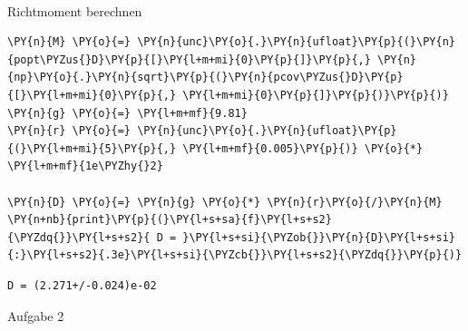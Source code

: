     \begin{center}
    \end{center}
    { \hspace*{\fill} \\}
    
    Richtmoment berechnen

    \begin{tcolorbox}[breakable, size=fbox, boxrule=1pt, pad at break*=1mm,colback=cellbackground, colframe=cellborder]
\begin{Verbatim}[commandchars=\\\{\}]
\PY{n}{M} \PY{o}{=} \PY{n}{unc}\PY{o}{.}\PY{n}{ufloat}\PY{p}{(}\PY{n}{popt\PYZus{}D}\PY{p}{[}\PY{l+m+mi}{0}\PY{p}{]}\PY{p}{,} \PY{n}{np}\PY{o}{.}\PY{n}{sqrt}\PY{p}{(}\PY{n}{pcov\PYZus{}D}\PY{p}{[}\PY{l+m+mi}{0}\PY{p}{,} \PY{l+m+mi}{0}\PY{p}{]}\PY{p}{)}\PY{p}{)}
\PY{n}{g} \PY{o}{=} \PY{l+m+mf}{9.81}
\PY{n}{r} \PY{o}{=} \PY{n}{unc}\PY{o}{.}\PY{n}{ufloat}\PY{p}{(}\PY{l+m+mi}{5}\PY{p}{,} \PY{l+m+mf}{0.005}\PY{p}{)} \PY{o}{*} \PY{l+m+mf}{1e\PYZhy{}2}

\PY{n}{D} \PY{o}{=} \PY{n}{g} \PY{o}{*} \PY{n}{r}\PY{o}{/}\PY{n}{M}
\PY{n+nb}{print}\PY{p}{(}\PY{l+s+sa}{f}\PY{l+s+s2}{\PYZdq{}}\PY{l+s+s2}{ D = }\PY{l+s+si}{\PYZob{}}\PY{n}{D}\PY{l+s+si}{:}\PY{l+s+s2}{.3e}\PY{l+s+si}{\PYZcb{}}\PY{l+s+s2}{\PYZdq{}}\PY{p}{)}
\end{Verbatim}
\end{tcolorbox}

    \begin{Verbatim}[commandchars=\\\{\}]
 D = (2.271+/-0.024)e-02
    \end{Verbatim}

    Aufgabe 2

